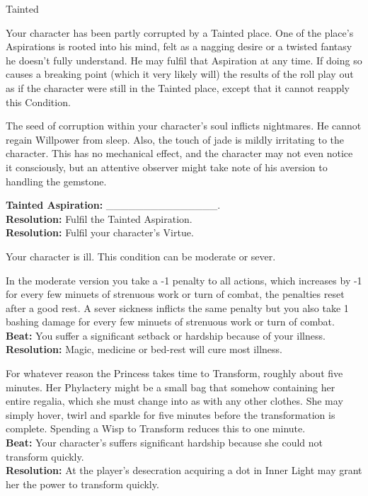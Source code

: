 \documentclass[10pt, frontgrid, backgrid]{flacards}
\begin{document}
\Cond
{Tainted}
{Your character has been partly corrupted by a Tainted place. One of the place’s Aspirations is rooted into his mind, felt as a nagging desire or a twisted fantasy he doesn’t fully understand. He may fulfil that Aspiration at any time. If doing so causes a breaking point (which it very likely will) the results of the roll play out as if the character were still in the Tainted place, except that it cannot reapply this Condition.

The seed of corruption within your character’s soul inflicts nightmares. He cannot regain Willpower from sleep. Also, the touch of jade is mildly irritating to the character. This has no mechanical effect, and the character may not even notice it consciously, but an attentive observer might take note of his aversion to handling the gemstone.

\textbf{Tainted Aspiration:} \_\_\_\_\_\_\_\_\_\_\_\_\_\_\_.\\
\textbf{Resolution:} Fulfil the Tainted Aspiration.\\
\textbf{Resolution:} Fulfil your character’s Virtue.
}

{Your character is ill. This condition can be moderate or sever.

In the moderate version you take a -1 penalty to all actions, which increases by -1 for every few minuets of strenuous work or turn of combat, the penalties reset after a good rest. A sever sickness inflicts the same penalty but you also take 1 bashing damage for every few minuets of strenuous work or turn of combat.\\
\textbf{Beat:} You suffer a significant setback or hardship because of your illness. \\
\textbf{Resolution:} Magic, medicine or bed-rest will cure most illness.}

{For whatever reason the Princess takes time to Transform, roughly about five minutes. Her Phylactery might be a small bag that somehow containing her entire regalia, which she must change into as with any other clothes. She may simply hover, twirl and sparkle for five minutes before the transformation is complete. Spending a Wisp to Transform reduces this to one minute.\\
\textbf{Beat:} Your character's suffers significant hardship because she could not transform quickly.\\
\textbf{Resolution:} At the player's desecration acquiring a dot in Inner Light may grant her the power to transform quickly. }
\end{document}
